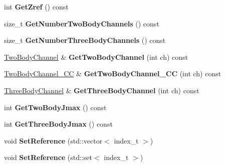 \begin{DoxyCompactItemize}
\item 
\hypertarget{classModelSpace_af23deb75791febf7bd5cc711ab0a4b33}{int {\bfseries Get\-Zref} () const }\label{classModelSpace_af23deb75791febf7bd5cc711ab0a4b33}

\item 
\hypertarget{classModelSpace_a1e4682c946e15141f463bf932a535282}{size\-\_\-t {\bfseries Get\-Number\-Two\-Body\-Channels} () const }\label{classModelSpace_a1e4682c946e15141f463bf932a535282}

\item 
\hypertarget{classModelSpace_a12ffe527ac47b2d2428baac85e88f97f}{size\-\_\-t {\bfseries Get\-Number\-Three\-Body\-Channels} () const }\label{classModelSpace_a12ffe527ac47b2d2428baac85e88f97f}

\item 
\hypertarget{classModelSpace_ab2c315fd347fe93dd63246dea3d02f35}{\hyperlink{structTwoBodyChannel}{Two\-Body\-Channel} \& {\bfseries Get\-Two\-Body\-Channel} (int ch) const }\label{classModelSpace_ab2c315fd347fe93dd63246dea3d02f35}

\item 
\hypertarget{classModelSpace_a6709279838180ef0a6745320c9ad6926}{\hyperlink{classTwoBodyChannel__CC}{Two\-Body\-Channel\-\_\-\-C\-C} \& {\bfseries Get\-Two\-Body\-Channel\-\_\-\-C\-C} (int ch) const }\label{classModelSpace_a6709279838180ef0a6745320c9ad6926}

\item 
\hypertarget{classModelSpace_a6c6de22dcfb8f4bb623d3935abf95ea1}{\hyperlink{structThreeBodyChannel}{Three\-Body\-Channel} \& {\bfseries Get\-Three\-Body\-Channel} (int ch) const }\label{classModelSpace_a6c6de22dcfb8f4bb623d3935abf95ea1}

\item 
\hypertarget{classModelSpace_a3cbf323130388fae05fed1b59c5bac90}{int {\bfseries Get\-Two\-Body\-Jmax} () const }\label{classModelSpace_a3cbf323130388fae05fed1b59c5bac90}

\item 
\hypertarget{classModelSpace_a23ec9e8797755abfc0986b2e2c73a056}{int {\bfseries Get\-Three\-Body\-Jmax} () const }\label{classModelSpace_a23ec9e8797755abfc0986b2e2c73a056}

\item 
\hypertarget{classModelSpace_a2c0036022f88a7f478e10c3d6006531e}{void {\bfseries Set\-Reference} (std\-::vector$<$ index\-\_\-t $>$)}\label{classModelSpace_a2c0036022f88a7f478e10c3d6006531e}

\item 
\hypertarget{classModelSpace_ab71a3090e0fb13313a58d904fa9f716a}{void {\bfseries Set\-Reference} (std\-::set$<$ index\-\_\-t $>$)}\label{classModelSpace_ab71a3090e0fb13313a58d904fa9f716a}


\end{DoxyCompactItemize}
